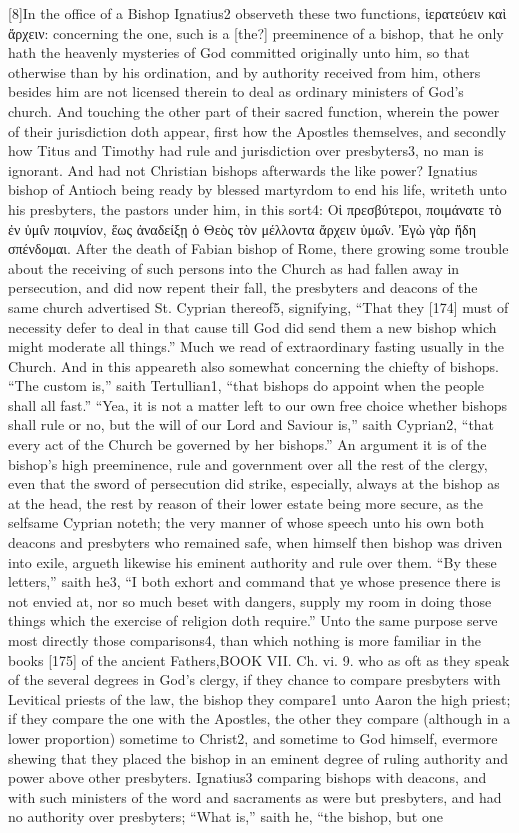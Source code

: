 [8]In the office of a Bishop Ignatius2 observeth these two functions, ἱερατεύειν καὶ ἄρχειν: concerning the one, such is a [the?] preeminence of a bishop, that he only hath the heavenly mysteries of God committed originally unto him, so that otherwise than by his ordination, and by authority received from him, others besides him are not licensed therein to deal as ordinary ministers of God’s church. And touching the other part of their sacred function, wherein the power of their jurisdiction doth appear, first how the Apostles themselves, and secondly how Titus and Timothy had rule and jurisdiction over presbyters3, no man is ignorant. And had not Christian bishops afterwards the like power? Ignatius bishop of Antioch being ready by blessed martyrdom to end his life, writeth unto his presbyters, the pastors under him, in this sort4: Οἱ πρεσβύτεροι, ποιμάνατε τὸ ἐν ὑμι̑ν ποιμνίον, ἕως ἀναδείξῃ ὁ Θεὸς τὸν μέλλοντα ἄρχειν ὑμω̑ν. Ἐγὼ γὰρ ἤδη σπένδομαι. After the death of Fabian bishop of Rome, there growing some trouble about the receiving of such persons into the Church as had fallen away in persecution, and did now repent their fall, the presbyters and deacons of the same church advertised St. Cyprian thereof5, signifying, “That they [174] must of necessity defer to deal in that cause till God did send them a new bishop which might moderate all things.” Much we read of extraordinary fasting usually in the Church. And in this appeareth also somewhat concerning the chiefty of bishops. “The custom is,” saith Tertullian1, “that bishops do appoint when the people shall all fast.” “Yea, it is not a matter left to our own free choice whether bishops shall rule or no, but the will of our Lord and Saviour is,” saith Cyprian2, “that every act of the Church be governed by her bishops.” An argument it is of the bishop’s high preeminence, rule and government over all the rest of the clergy, even that the sword of persecution did strike, especially, always at the bishop as at the head, the rest by reason of their lower estate being more secure, as the selfsame Cyprian noteth; the very manner of whose speech unto his own both deacons and presbyters who remained safe, when himself then bishop was driven into exile, argueth likewise his eminent authority and rule over them. “By these letters,” saith he3, “I both exhort and command that ye whose presence there is not envied at, nor so much beset with dangers, supply my room in doing those things which the exercise of religion doth require.” Unto the same purpose serve most directly those comparisons4, than which nothing is more familiar in the books [175] of the ancient Fathers,BOOK VII. Ch. vi. 9. who as oft as they speak of the several degrees in God’s clergy, if they chance to compare presbyters with Levitical priests of the law, the bishop they compare1 unto Aaron the high priest; if they compare the one with the Apostles, the other they compare (although in a lower proportion) sometime to Christ2, and sometime to God himself, evermore shewing that they placed the bishop in an eminent degree of ruling authority and power above other presbyters. Ignatius3 comparing bishops with deacons, and with such ministers of the word and sacraments as were but presbyters, and had no authority over presbyters; “What is,” saith he, “the bishop, but one 